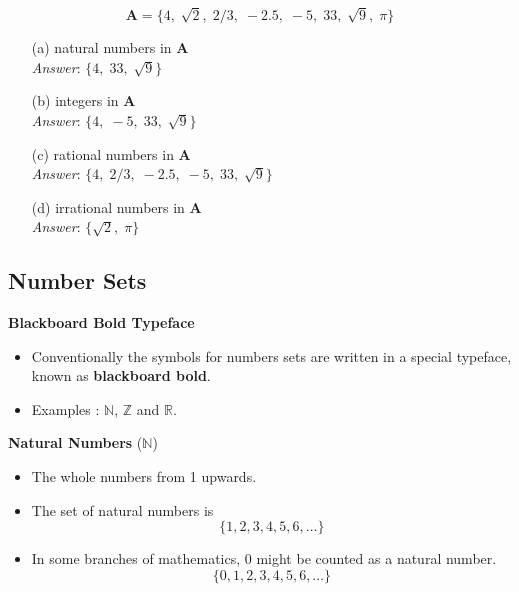\documentclass[11pt,a4paper,titlepage,oneside,openany]{article}
\numberwithin{equation}{section}
\numberwithin{algorithm}{section}
\numberwithin{figure}{section}
\numberwithin{table}{section}
\begin{document}
{%

\[\boldsymbol{A} = \{4,\; \sqrt{2},\; 2/3,\; -2.5,\; -5,\; 33,\; \sqrt{9},\; \pi \}\]
\begin{itemize}
\item[(a)] natural numbers in \textbf{A}\\
\hspace{1cm} \textit{Answer}: $\{4,\; 33,\; \sqrt{9}\}$
\item[(b)] integers in \textbf{A}\\
\hspace{1cm} \textit{Answer}: $\{4,\; -5,\; 33,\; \sqrt{9}\}$
\item[(c)] rational numbers in \textbf{A}\\
\hspace{1cm} \textit{Answer}: $\{4,\; 2/3,\; -2.5,\; -5,\; 33,\; \sqrt{9}\}$
\item[(d)] irrational numbers in \textbf{A}\\
\hspace{1cm} \textit{Answer}: $\{\sqrt{2},\; \pi\}$
\end{itemize}




\subsection{Number Sets}

\textbf{Blackboard Bold Typeface}

\begin{itemize}
\item Conventionally the symbols for numbers sets are written in a special typeface, known as \textbf{blackboard bold}.
\item Examples : $\mathbb{N}$, $\mathbb{Z}$ and $\mathbb{R}$.

\end{itemize}


\textbf{Natural Numbers} ($\mathbb{N}$)
\begin{itemize}
\item The whole numbers from 1 upwards. 

\item The set of natural numbers is 
\[\{1,2,3,4,5,6,\ldots\} \]
\item In some branches of mathematics, $0$ might be counted as a natural number.
\[\{0,1,2,3,4,5,6,\ldots\} \]
\end{itemize}

}
\end{document}
